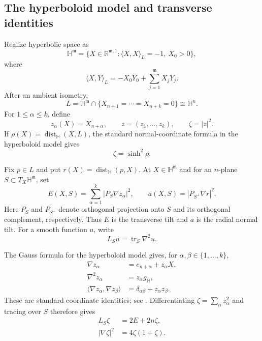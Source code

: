 \documentclass[11pt,reqno]{amsart}
\numberwithin{equation}{section}
\theoremstyle{definition}
\theoremstyle{remark}
\newcommand{\Hyp}{\mathbb H}
\newcommand{\R}{\mathbb R}
\newcommand{\dist}{\operatorname{dist}}
\newcommand{\tr}{\operatorname{tr}}
\begin{document}
\subsection{The hyperboloid model and transverse identities}
\label{sec:hyperboloid}

Realize hyperbolic space as
\begin{equation}\label{eq:hyperboloid}
 \Hyp^{\mathfrak m}=\bigl\{X\in\R^{\mathfrak m,1}:
 \langle X,X\rangle_L=-1,\ X_0>0\bigr\},
\end{equation}
where
\[
 \langle X,Y\rangle_L=-X_0Y_0+\sum_{j=1}^{\mathfrak m}X_jY_j.
\]
After an ambient isometry,
\begin{equation}\label{eq:L-model}
 L=\Hyp^{\mathfrak m}\cap\{X_{n+1}=\cdots=X_{n+k}=0\}
 \cong\Hyp^n.
\end{equation}
For $1\le\alpha\le k$, define
\[
 z_\alpha(X)=X_{n+\alpha},
 \qquad z=(z_1,\dots,z_k),
 \qquad \zeta=|z|^2.
\]
If $\rho(X)=\dist_{\Hyp}(X,L)$, the standard normal-coordinate formula in the
hyperboloid model gives
\begin{equation}\label{eq:zeta-rho}
 \zeta=\sinh^2\rho.
\end{equation}

Fix $p\in L$ and put $r(X)=\dist_{\Hyp}(p,X)$.  At
$X\in\Hyp^{\mathfrak m}$ and for an $n$-plane
$S\subset T_X\Hyp^{\mathfrak m}$, set
\begin{equation}\label{eq:E-a}
 E(X,S)=\sum_{\alpha=1}^k|P_S\nabla z_\alpha|^2,
 \qquad
 a(X,S)=|P_{S^\perp}\nabla r|^2.
\end{equation}
Here $P_S$ and $P_{S^\perp}$ denote orthogonal projection onto $S$ and its
orthogonal complement, respectively.  Thus $E$ is the transverse tilt and
$a$ is the radial normal tilt.  For a smooth function $u$, write
\[
L_Su=\tr_S\nabla^2u.
\]

The Gauss formula for the hyperboloid model gives, for
$\alpha,\beta\in\{1,\dots,k\}$,
\begin{align}
 \nabla z_\alpha&=e_{n+\alpha}+z_\alpha X, \label{eq:grad-z}\\
 \nabla^2z_\alpha&=z_\alpha g_{\Hyp}, \label{eq:hess-z}\\
 \langle\nabla z_\alpha,\nabla z_\beta\rangle
 &=\delta_{\alpha\beta}+z_\alpha z_\beta. \label{eq:gram-z}
\end{align}
These are standard coordinate identities; see
\cite[Chapter~3]{Ratcliffe}.  Differentiating $\zeta=\sum_\alpha z_\alpha^2$
and tracing over $S$ therefore gives
\begin{align}
 L_S\zeta&=2E+2n\zeta, \label{eq:Lzeta}\\
 |\nabla \zeta|^2&=4\zeta(1+\zeta). \label{eq:grad-zeta}
\end{align}
\end{document}
